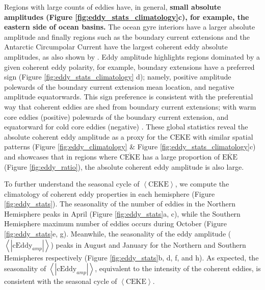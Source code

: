 \documentclass[draft,linenumbers]{agujournal2019}
\newcommand{\MEKE}{\overline{\textrm{EKE}}}
\newcommand{\MCEKE}{\overline{\textrm{CEKE}}}
\newcommand{\CEKE}{\textrm{CEKE}}
\newcommand{\cEddy}{\textrm{cEddy}}
\begin{document}
	Regions with large counts of eddies have, in general, \textbf{small absolute amplitudes (Figure \ref{fig:eddy_stats_climatology}c), for example, the eastern side of ocean basins.}
	The ocean gyre interiors have a larger absolute amplitude and finally regions such as the boundary current extensions and the Antarctic Circumpolar Current have the largest coherent eddy absolute amplitudes, as also shown by \citet{Chelton_The_2011}.
	Eddy amplitude highlights regions dominated by a given coherent eddy polarity, for example, boundary extensions have a preferred sign (Figure \ref{fig:eddy_stats_climatology} d); namely, positive amplitude polewards of the boundary current extension mean location, and negative amplitude equatorwards. 
	This sign preference is consistent with the preferential way that coherent eddies are shed from boundary current extensions; with warm core eddies (positive)  polewards of the boundary current extension, and equatorward for cold core eddies (negative) \citep{Chelton_Global_2007,Chelton_The_2011,Kang_eddy_characteristics_2013}. 
	These global statistics reveal the absolute coherent eddy amplitude as a proxy for the $\CEKE$ with similar spatial patterns (Figure \ref{fig:eddy_climatology} \& Figure \ref{fig:eddy_stats_climatology}c) and showcases that in regions where $\MCEKE$ has a large proportion of $\MEKE$ (Figure \ref{fig:eddy_ratio}), the absolute coherent eddy amplitude is also large.

	To further understand the seasonal cycle of $\left<\CEKE\right>$, we compute the climatology of coherent eddy properties in each hemisphere (Figure \ref{fig:eddy_stats}). 
	The seasonality of the number of eddies in the Northern Hemisphere peaks in April (Figure \ref{fig:eddy_stats}a, c), while the Southern Hemisphere maximum number of eddies occurs during October (Figure \ref{fig:eddy_stats}e, g). 
	Meanwhile, the seasonality of the eddy amplitude ($\left<|\cEddy_{amp}|\right>$) peaks in August and January for the Northern and Southern Hemispheres respectively (Figure \ref{fig:eddy_stats}b, d, f, and h). 
	As expected, the seasonality of $\left<|\cEddy_{amp}|\right>$, equivalent to the intensity of the coherent eddies, is consistent with the seasonal cycle of $\left<\CEKE\right>$.
\end{document}
